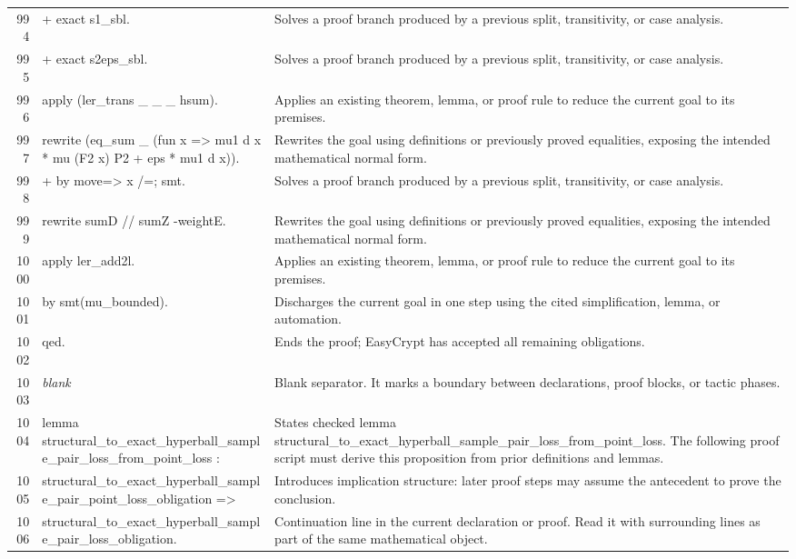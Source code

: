 \documentclass[10pt]{article}
\begin{document}
\begin{longtable}{r L{0.53\textwidth} L{0.37\textwidth}}
994 & {\ttfamily\scriptsize   + exact s1\_sbl.} & Solves a proof branch produced by a previous split, transitivity, or case analysis. \\
995 & {\ttfamily\scriptsize   + exact s2eps\_sbl.} & Solves a proof branch produced by a previous split, transitivity, or case analysis. \\
996 & {\ttfamily\scriptsize apply (ler\_trans \_ \_ \_ hsum).} & Applies an existing theorem, lemma, or proof rule to reduce the current goal to its premises. \\
997 & {\ttfamily\scriptsize rewrite (eq\_sum \_ (fun x => mu1 d x * mu (F2 x) P2 + eps * mu1 d x)).} & Rewrites the goal using definitions or previously proved equalities, exposing the intended mathematical normal form. \\
998 & {\ttfamily\scriptsize + by move=> x /=; smt.} & Solves a proof branch produced by a previous split, transitivity, or case analysis. \\
999 & {\ttfamily\scriptsize rewrite sumD // sumZ -weightE.} & Rewrites the goal using definitions or previously proved equalities, exposing the intended mathematical normal form. \\
1000 & {\ttfamily\scriptsize apply ler\_add2l.} & Applies an existing theorem, lemma, or proof rule to reduce the current goal to its premises. \\
1001 & {\ttfamily\scriptsize by smt(mu\_bounded).} & Discharges the current goal in one step using the cited simplification, lemma, or automation. \\
1002 & {\ttfamily\scriptsize qed.} & Ends the proof; EasyCrypt has accepted all remaining obligations. \\
1003 & {\ttfamily\scriptsize \emph{blank}} & Blank separator.  It marks a boundary between declarations, proof blocks, or tactic phases. \\
1004 & {\ttfamily\scriptsize lemma structural\_to\_exact\_hyperball\_sample\_pair\_loss\_from\_point\_loss :} & States checked lemma structural\_to\_exact\_hyperball\_sample\_pair\_loss\_from\_point\_loss.  The following proof script must derive this proposition from prior definitions and lemmas. \\
1005 & {\ttfamily\scriptsize   structural\_to\_exact\_hyperball\_sample\_pair\_point\_loss\_obligation =>} & Introduces implication structure: later proof steps may assume the antecedent to prove the conclusion. \\
1006 & {\ttfamily\scriptsize   structural\_to\_exact\_hyperball\_sample\_pair\_loss\_obligation.} & Continuation line in the current declaration or proof.  Read it with surrounding lines as part of the same mathematical object. \\

\end{longtable}
\end{document}
